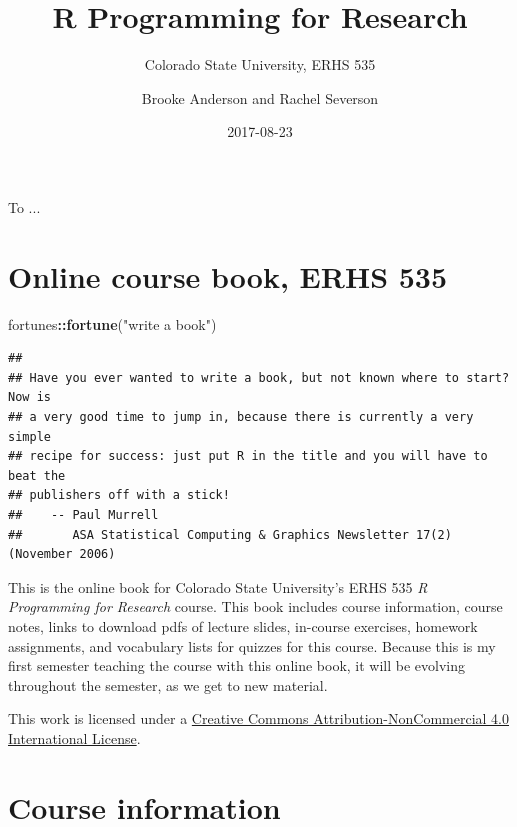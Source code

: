 \documentclass[]{book}
\title{R Programming for Research}
\subtitle{Colorado State University, ERHS 535}
\author{Brooke Anderson and Rachel Severson}
\date{2017-08-23}
\makeatletter
\newenvironment{Shaded}{\begin{snugshade}}{\end{snugshade}}
\newcommand{\KeywordTok}[1]{\textcolor[rgb]{0.13,0.29,0.53}{\textbf{#1}}}
\newcommand{\StringTok}[1]{\textcolor[rgb]{0.31,0.60,0.02}{#1}}
\newcommand{\OperatorTok}[1]{\textcolor[rgb]{0.81,0.36,0.00}{\textbf{#1}}}
\newcommand{\NormalTok}[1]{#1}
\newenvironment{kframe}{%
\medskip{}
\setlength{\fboxsep}{.8em}
 \def\at@end@of@kframe{}%
 \ifinner\ifhmode%
  \def\at@end@of@kframe{\end{minipage}}%
  \begin{minipage}{\columnwidth}%
 \fi\fi%
 \def\FrameCommand##1{\hskip\@totalleftmargin \hskip-\fboxsep
 \colorbox{shadecolor}{##1}\hskip-\fboxsep
     \hskip-\linewidth \hskip-\@totalleftmargin \hskip\columnwidth}%
 \MakeFramed {\advance\hsize-\width
   \@totalleftmargin\z@ \linewidth\hsize
   \@setminipage}}%
 {\par\unskip\endMakeFramed%
 \at@end@of@kframe}
\renewenvironment{Shaded}{\begin{kframe}}{\end{kframe}}
\theoremstyle{definition}
\theoremstyle{definition}
\theoremstyle{definition}
\theoremstyle{remark}
\makeatother
\begin{document}
\maketitle

\cleardoublepage\newpage\thispagestyle{empty}\null
\cleardoublepage\newpage\thispagestyle{empty}
\begin{center}
To ...
\end{center}

\frontmatter

{
\setcounter{tocdepth}{1}
\tableofcontents
}
\chapter*{Online course book, ERHS
535}\label{online-course-book-erhs-535}

\begin{Shaded}
\begin{Highlighting}[]
\NormalTok{fortunes}\OperatorTok{::}\KeywordTok{fortune}\NormalTok{(}\StringTok{"write a book"}\NormalTok{)}
\end{Highlighting}
\end{Shaded}

\begin{verbatim}
## 
## Have you ever wanted to write a book, but not known where to start? Now is
## a very good time to jump in, because there is currently a very simple
## recipe for success: just put R in the title and you will have to beat the
## publishers off with a stick!
##    -- Paul Murrell
##       ASA Statistical Computing & Graphics Newsletter 17(2) (November 2006)
\end{verbatim}

This is the online book for Colorado State University's ERHS 535 \emph{R
Programming for Research} course. This book includes course information,
course notes, links to download pdfs of lecture slides, in-course
exercises, homework assignments, and vocabulary lists for quizzes for
this course. Because this is my first semester teaching the course with
this online book, it will be evolving throughout the semester, as we get
to new material.

This work is licensed under a
\href{https://creativecommons.org/licenses/by-nc/4.0/}{Creative Commons
Attribution-NonCommercial 4.0 International License}.

\mainmatter

\chapter*{Course information}\label{course-information}
\end{document}
